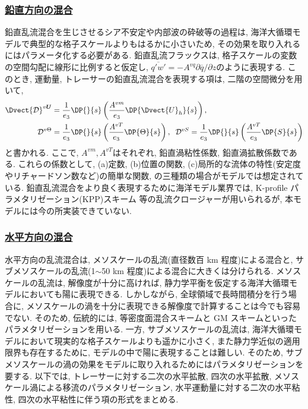 \subsubsection*{\underline{鉛直方向の混合}}
鉛直乱流混合を生じさせるシア不安定や内部波の砕破等の過程は, 
海洋大循環モデルで典型的な格子スケールよりもはるかに小さいため, 
その効果を取り入れるにはパラメータ化する必要がある. 
鉛直乱流フラックスは, 格子スケールの変数の空間勾配に線形に比例すると仮定し, 
$\overline{q'w'}= -A^{vq} \partial{\overline{q}}/\partial {z}$のように表現する. 
このとき, 運動量, トレーサーの鉛直乱流混合を表現する項は, 二階の空間微分を用いて, 
\begin{equation*}
\begin{split}
 \Dvect{\mathcal{D}}^{v{\bm U}} 
    &= \dfrac{1}{e_3} \DP{}{s}\left( \dfrac{A^{vm}}{e_3} \DP{\Dvect{U}_h}{s} \right), \\
 \mathcal{D}^{v\Theta}  &= \dfrac{1}{e_3}\DP{}{s}\left( \dfrac{A^{vT}}{e_3} \DP{\Theta}{s} \right), \;\;
 \mathcal{D}^{vS}  = \dfrac{1}{e_3}\DP{}{s}\left( \dfrac{A^{vT}}{e_3} \DP{S}{s} \right)
\end{split}
\end{equation*}
と書かれる. 
ここで, $A^{vm}, A^{vT}$はそれぞれ, 鉛直渦粘性係数, 鉛直渦拡散係数である. 
これらの係数として, (a)定数, (b)位置の関数, (c)局所的な流体の特性(安定度やリチャードソン数など)の簡単な関数, 
の三種類の場合がモデルでは想定されている. 
鉛直乱流混合をより良く表現するために海洋モデル業界では, K-profile パラメタリゼーション(KPP)スキーム
\citep{large1994oceanic}等の乱流クロージャーが用いられるが, 本モデルには今の所実装できていない. 

\subsubsection*{\underline{水平方向の混合}}
水平方向の乱流混合は, メソスケールの乱流(直径数百 km 程度)による混合と, 
サブメソスケールの乱流(1$\sim$50 km 程度)による混合に大きくは分けられる. 
メソスケールの乱流は, 解像度が十分に高ければ, 静力学平衡を仮定する海洋大循環モデルにおいても陽に表現できる. 
しかしながら, 全球領域で長時間積分を行う場合に, メソスケールの渦を十分に表現できる解像度で計算することは今でも容易でない.  
そのため, 伝統的には, 等密度面混合スキーム\citep{redi1982oceanic}と 
GM スキーム\citep{gent1990isopycnal}といったパラメタリゼーションを用いる.
一方, サブメソスケールの乱流は, 海洋大循環モデルにおいて現実的な格子スケールよりも遥かに小さく, 
また静力学近似の適用限界も存在するために, モデルの中で陽に表現することは難しい. 
そのため, サブメソスケールの渦の効果をモデルに取り入れるためにはパラメタリゼーションを要する.  
以下では, トレーサーに対する二次の水平拡散, 四次の水平拡散, メソスケール渦による移流のパラメタリゼーション, 
水平運動量に対する二次の水平粘性, 四次の水平粘性に伴う項の形式をまとめる. 


